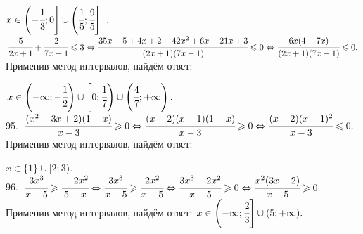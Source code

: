 \documentclass[12pt]{article}
\begin{document}
$x\in\left(-\cfrac{1}{3};0\right]\cup\left(\cfrac{1}{5};\cfrac{9}{5}\right].$\newpage{}. $\cfrac{5}{2x+1}+\cfrac{2}{7x-1}\leqslant3\Leftrightarrow\cfrac{35x-5+4x+2-42x^2+6x-21x+3}{(2x+1)(7x-1)}\leqslant 0\Leftrightarrow
\cfrac{6x(4-7x)}{(2x+1)(7x-1)}\leqslant 0.$ Применив метод интервалов, найдём ответ:
\begin{figure}[ht!]
\end{figure}
$x\in\left(-\infty;-\cfrac{1}{2}\right)\cup\left[0;\cfrac{1}{7}\right)\cup\left(\cfrac{4}{7};+\infty\right).$\\
95. $\cfrac{(x^2-3x+2)(1-x)}{x-3}\geqslant0\Leftrightarrow\cfrac{(x-2)(x-1)(1-x)}{x-3}\geqslant0\Leftrightarrow\cfrac{(x-2)(x-1)^2}{x-3}\leqslant0.$ Применив метод интервалов, найдём ответ:
\begin{figure}[ht!]
\end{figure}
$x\in\{1\}\cup[2;3).$\\
96. $\cfrac{3x^3}{x-5}\geqslant\cfrac{-2x^2}{5-x}\Leftrightarrow\cfrac{3x^3}{x-5}\geqslant\cfrac{2x^2}{x-5}\Leftrightarrow
\cfrac{3x^3-2x^2}{x-5}\geqslant0\Leftrightarrow\cfrac{x^2(3x-2)}{x-5}\geqslant0.$ Применив метод интервалов, найдём ответ: $x\in\left(-\infty;\cfrac{2}{3}\right]
\cup(5;+\infty).$
\begin{figure}[ht!]
\end{figure}\\
\end{document}
